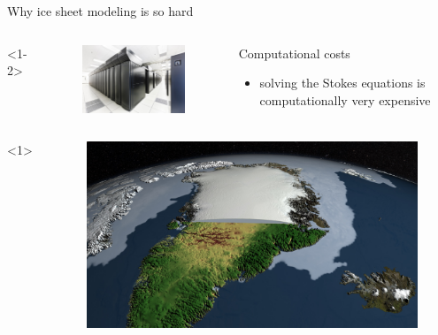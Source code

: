 \documentclass[hide notes,intlimits]{beamer}
\begin{document}
\begin{frame}{Why ice sheet modeling is so hard}
    \begin{columns}[c]<1-2>
      \begin{column}{.3\linewidth}
        \begin{figure}
          \includegraphics[width=\linewidth]{bw_front_sm}
        \end{figure}
      \end{column}
      \begin{column}{.67\linewidth}
        \begin{block}{Computational costs}
        \begin{itemize}
        \item solving the Stokes equations is computationally very expensive
        \end{itemize}
      \end{block}
      \end{column}
    \end{columns}
    \begin{columns}[c]<1>
      \begin{column}{.28\linewidth}
        \begin{figure}
          \includegraphics[width=\linewidth]{canale_grande_V05}

\end{figure}
\end{column}
\end{columns}
\end{frame}
\end{document}
